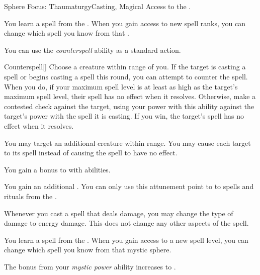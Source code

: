     \begin{feat}{Sphere Focus: Thaumaturgy}{Casting, Magical}
        \featpre Access to the  .

         You learn a spell from the  .
        When you gain access to new spell ranks, you can change which spell you know from that .

         You can use the \textit{counterspell} ability as a standard action.
        \begin{freeability}{Counterspell}[]
            Choose a creature within \rngmed range of you.
            If the target is casting a spell or begins casting a spell this round, you can attempt to counter the spell.
            When you do, if your maximum spell level is at least as high as the target's maximum spell level, their spell has no effect when it resolves.
            Otherwise, make a contested  check against the target, using your power with this ability against the target's power with the spell it is casting.
            If you win, the target's spell has no effect when it resolves.

            \rankline
             You may target an additional creature within range.
             You may cause each target to  its spell instead of causing the spell to have no effect.
        \end{freeability}

         You gain a  bonus to  with  abilities.

         You gain an additional .
        You can only use this attunement point to  to spells and rituals from the  .

         Whenever you cast a spell that deals damage, you may change the type of damage to energy damage.
        This does not change any other aspects of the spell.

         You learn a spell from the  .
        When you gain access to a new spell level, you can change which spell you know from that mystic sphere.

         The bonus from your \textit{mystic power} ability increases to .
    \end{feat}

